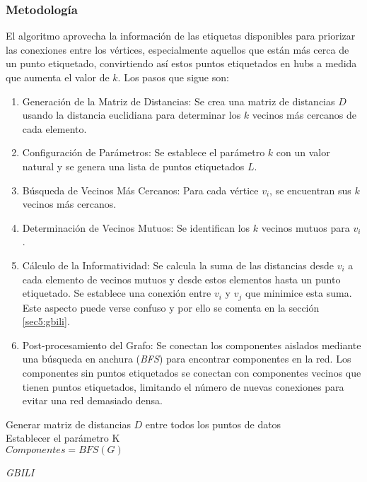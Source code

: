 \subsubsection{Metodología}
El algoritmo aprovecha la información de las etiquetas disponibles para priorizar las conexiones entre los vértices, especialmente aquellos que están más cerca de un punto etiquetado, convirtiendo así estos puntos etiquetados en hubs a medida que aumenta el valor de $k$.
Los pasos que sigue son:
\begin{enumerate}
	\item Generación de la Matriz de Distancias: Se crea una matriz de distancias $D$ usando la distancia euclidiana para determinar los $k$ vecinos más cercanos de cada elemento.
	\item Configuración de Parámetros: Se establece el parámetro $k$ con un valor natural y se genera una lista de puntos etiquetados	$L$.
	\item Búsqueda de Vecinos Más Cercanos: Para cada vértice $v_i$, se encuentran sus $k$ vecinos más cercanos.
	\item Determinación de Vecinos Mutuos: Se identifican los $k$ vecinos mutuos para $v_i$.
	\item Cálculo de la Informatividad: Se calcula la suma de las distancias desde $v_i$ a cada elemento de vecinos mutuos y desde estos elementos hasta un punto etiquetado. Se establece una conexión entre $v_i$ y $v_j$ que minimice esta suma. Este aspecto puede verse confuso y por ello se comenta en la sección \ref{sec5:gbili}.
	\item Post-procesamiento del Grafo: Se conectan los componentes aislados mediante una búsqueda en anchura (\textit{BFS}) para encontrar componentes en la red. Los componentes sin puntos etiquetados se conectan con componentes vecinos que tienen puntos etiquetados, limitando el número de nuevas conexiones para evitar una red demasiado densa.
\end{enumerate}

\begin{algorithm}[H]
\scriptsize
	\label{alg:Gbili}
	\BlankLine
	Generar matriz de distancias $D$ entre todos los puntos de datos\\
	Establecer el parámetro K\\
	$Componentes = BFS(G)$\\
	\caption{\textit{GBILI}}
\end{algorithm}

